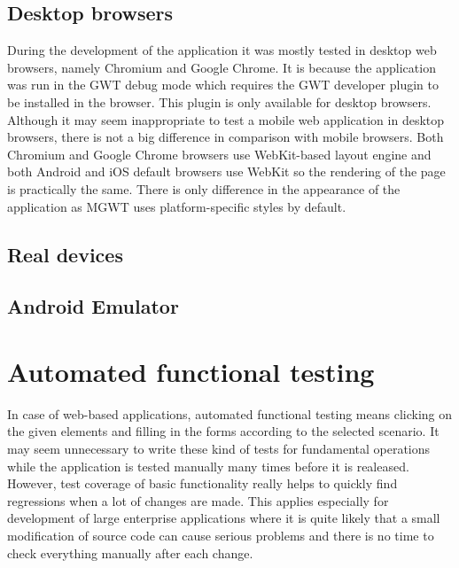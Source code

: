 \documentclass[12pt,oneside,final]{fithesis2}
\begin{document}
\subsection{Desktop browsers}
During the development of the application it was mostly tested in desktop web browsers, namely Chromium and Google Chrome.
It is because the application was run in the GWT debug mode which requires the GWT developer plugin to be installed in the browser.
This plugin is only available for desktop browsers.
Although it may seem inappropriate to test a mobile web application in desktop browsers, there is not a big difference in comparison with mobile browsers.
Both Chromium and Google Chrome browsers use WebKit-based layout engine and both Android and iOS default browsers use WebKit so the rendering of the page is practically the same.
There is only difference in the appearance of the application as MGWT uses platform-specific styles by default.

\subsection{Real devices}

\subsection{Android Emulator}

\section{Automated functional testing}
In case of web-based applications, automated functional testing means clicking on the given elements and filling in the forms according to the selected scenario.
It may seem unnecessary to write these kind of tests for fundamental operations while the application is tested manually many times before it is realeased.
However, test coverage of basic functionality really helps to quickly find regressions when a lot of changes are made.
This applies especially for development of large enterprise applications where it is quite likely that a small modification of source code can cause serious problems and there is no time to check everything manually after each change.
\end{document}
